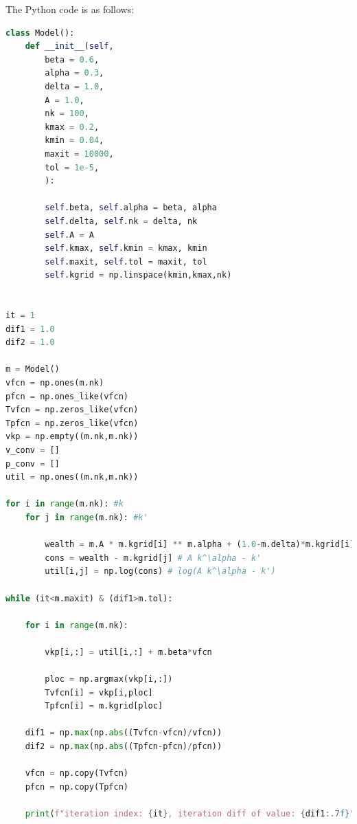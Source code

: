 \documentclass{ltjsarticle}
\begin{document}
The Python code is as follows:
\begin{lstlisting}[language=python,
    backgroundcolor=\color{backcolour},
    commentstyle=\color{codegreen},
    morekeywords={as},
    classoffset=0,
    keywordstyle=\color{codepurple},
    deletekeywords={list,in,float},
    classoffset=1,
    morekeywords={list},
    keywordstyle=\color{blue!60!green},
    classoffset=2,
    morekeywords={in},
    keywordstyle=\color{blue},
    classoffset=3,
    morekeywords={float},
    keywordstyle=\color{blue!40!green},
    numberstyle=\tiny\color{black},
    stringstyle=\color{codered},
    basicstyle=\ttfamily\footnotesize,
    breaklines=true,
    emph={len,range,print},
    emphstyle=\color{yellow!40!black}
    ]
class Model():
    def __init__(self,
        beta = 0.6,
        alpha = 0.3,  
        delta = 1.0, 
        A = 1.0,     
        nk = 100,   
        kmax = 0.2,  
        kmin = 0.04, 
        maxit = 10000, 
        tol = 1e-5,
        ): 
        
        self.beta, self.alpha = beta, alpha 
        self.delta, self.nk = delta, nk 
        self.A = A
        self.kmax, self.kmin = kmax, kmin 
        self.maxit, self.tol = maxit, tol
        self.kgrid = np.linspace(kmin,kmax,nk)


it = 1 
dif1 = 1.0 
dif2 = 1.0 

m = Model()
vfcn = np.ones(m.nk)
pfcn = np.ones_like(vfcn)
Tvfcn = np.zeros_like(vfcn)
Tpfcn = np.zeros_like(vfcn)
vkp = np.empty((m.nk,m.nk))
v_conv = [] 
p_conv = [] 
util = np.ones((m.nk,m.nk))

for i in range(m.nk): #k
    for j in range(m.nk): #k'
        
        wealth = m.A * m.kgrid[i] ** m.alpha + (1.0-m.delta)*m.kgrid[i] #A k^\alpha
        cons = wealth - m.kgrid[j] # A k^\alpha - k'
        util[i,j] = np.log(cons) # log(A k^\alpha - k')

while (it<m.maxit) & (dif1>m.tol):

    for i in range(m.nk):
        
        vkp[i,:] = util[i,:] + m.beta*vfcn
        
        ploc = np.argmax(vkp[i,:])
        Tvfcn[i] = vkp[i,ploc]
        Tpfcn[i] = m.kgrid[ploc]
    
    dif1 = np.max(np.abs((Tvfcn-vfcn)/vfcn))
    dif2 = np.max(np.abs((Tpfcn-pfcn)/pfcn)) 
    
    vfcn = np.copy(Tvfcn)
    pfcn = np.copy(Tpfcn)

    print(f"iteration index: {it}, iteration diff of value: {dif1:.7f}")


\end{lstlisting}
\end{document}
